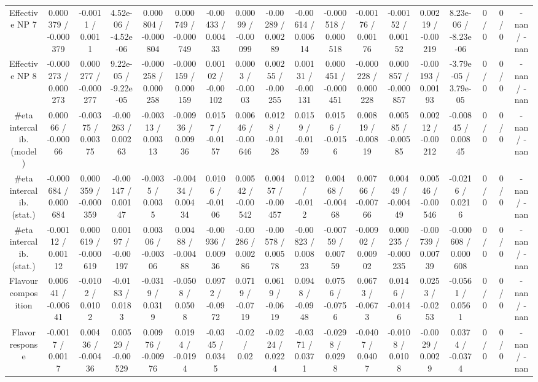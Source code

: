 \documentclass[10pt]{article}
\begin{document}
\begin{table}[htbp]
\begin{center}
\begin{tabular}{|c|c|c|c|c|c|c|c|c|c|c|c|c|c|c|c|c|c|}
  Effective NP 7 & 0.000379 / -0.000379 & -0.0011 / 0.0011 & 4.52e-06 / -4.52e-06 & 0.000804 / -0.000804 & 0.000749 / -0.000749 & -0.00433 / 0.00433 & 0.00099 / -0.00099 & -0.00289 / 0.00289 & -0.00614 / 0.00614 & -0.000518 / 0.000518 & -0.00176 / 0.00176 & -0.00152 / 0.00152 & 0.00219 / -0.00219 & 8.23e-06 / -8.23e-06 & 0 / 0 & 0 / 0 & -nan / -nan \\ 
  Effective NP 8 & -0.000273 / 0.000273 & 0.000277 / -0.000277 & 9.22e-05 / -9.22e-05 & -0.000258 / 0.000258 & -0.000159 / 0.000159 & 0.00102 / -0.00102 & 0.0003 / -0.0003 & 0.00255 / -0.00255 & 0.00131 / -0.00131 & 0.000451 / -0.000451 & -0.000228 / 0.000228 & 0.000857 / -0.000857 & -0.00193 / 0.00193 & -3.79e-05 / 3.79e-05 & 0 / 0 & 0 / 0 & -nan / -nan \\ 
  #eta intercalib. (model) & 0.00066 / -0.00066 & -0.00375 / 0.00375 & -0.00263 / 0.00263 & -0.00313 / 0.00313 & -0.00936 / 0.00936 & 0.0157 / -0.0157 & 0.00646 / -0.00646 & 0.0128 / -0.0128 & 0.0159 / -0.0159 & 0.0156 / -0.0156 & 0.00819 / -0.00819 & 0.00585 / -0.00585 & 0.00212 / -0.00212 & -0.00845 / 0.00845 & 0 / 0 & 0 / 0 & -nan / -nan \\ 
  #eta intercalib. (stat.) & -0.000684 / 0.000684 & 0.000359 / -0.000359 & -0.00147 / 0.00147 & -0.0035 / 0.0035 & -0.00434 / 0.00434 & 0.0106 / -0.0106 & 0.00542 / -0.00542 & 0.00457 / -0.00457 & 0.012 / -0.012 & 0.00468 / -0.00468 & 0.00766 / -0.00766 & 0.00449 / -0.00449 & 0.00546 / -0.00546 & -0.0216 / 0.0216 & 0 / 0 & 0 / 0 & -nan / -nan \\ 
  #eta intercalib. (stat.) & -0.00112 / 0.00112 & 0.000619 / -0.000619 & 0.00197 / -0.00197 & 0.00306 / -0.00306 & 0.00488 / -0.00488 & -0.00936 / 0.00936 & -0.00286 / 0.00286 & -0.00578 / 0.00578 & -0.00823 / 0.00823 & -0.00759 / 0.00759 & -0.00902 / 0.00902 & 0.000235 / -0.000235 & -0.00739 / 0.00739 & -0.000608 / 0.000608 & 0 / 0 & 0 / 0 & -nan / -nan \\ 
  Flavour composition & 0.00641 / -0.00641 & -0.0102 / 0.0102 & -0.0183 / 0.0183 & -0.0319 / 0.0319 & -0.0508 / 0.0508 & 0.0972 / -0.0972 & 0.0719 / -0.0719 & 0.0619 / -0.0619 & 0.0948 / -0.0948 & 0.0756 / -0.0756 & 0.0673 / -0.0673 & 0.0146 / -0.0146 & 0.0253 / -0.0253 & -0.0561 / 0.0561 & 0 / 0 & 0 / 0 & -nan / -nan \\ 
  Flavor response & -0.0017 / 0.0017 & 0.00436 / -0.00436 & 0.00529 / -0.00529 & 0.00976 / -0.00976 & 0.0194 / -0.0194 & -0.0345 / 0.0345 & -0.02 / 0.02 & -0.0224 / 0.0224 & -0.0371 / 0.0371 & -0.0298 / 0.0298 & -0.0407 / 0.0407 & -0.0108 / 0.0108 & -0.0029 / 0.0029 & 0.0374 / -0.0374 & 0 / 0 & 0 / 0 & -nan / -nan \\ 

\end{tabular}
\end{center}
\end{table}
\end{document}
